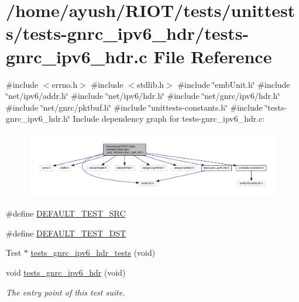\hypertarget{tests-gnrc__ipv6__hdr_8c}{}\section{/home/ayush/\+R\+I\+O\+T/tests/unittests/tests-\/gnrc\+\_\+ipv6\+\_\+hdr/tests-\/gnrc\+\_\+ipv6\+\_\+hdr.c File Reference}
\label{tests-gnrc__ipv6__hdr_8c}
{\ttfamily \#include $<$errno.\+h$>$}\newline
{\ttfamily \#include $<$stdlib.\+h$>$}\newline
{\ttfamily \#include \char`\"{}emb\+Unit.\+h\char`\"{}}\newline
{\ttfamily \#include \char`\"{}net/ipv6/addr.\+h\char`\"{}}\newline
{\ttfamily \#include \char`\"{}net/ipv6/hdr.\+h\char`\"{}}\newline
{\ttfamily \#include \char`\"{}net/gnrc/ipv6/hdr.\+h\char`\"{}}\newline
{\ttfamily \#include \char`\"{}net/gnrc/pktbuf.\+h\char`\"{}}\newline
{\ttfamily \#include \char`\"{}unittests-\/constants.\+h\char`\"{}}\newline
{\ttfamily \#include \char`\"{}tests-\/gnrc\+\_\+ipv6\+\_\+hdr.\+h\char`\"{}}\newline
Include dependency graph for tests-\/gnrc\+\_\+ipv6\+\_\+hdr.c\+:
\nopagebreak
\begin{figure}[H]
\begin{center}
\leavevmode
\includegraphics[width=350pt]{tests-gnrc__ipv6__hdr_8c__incl}
\end{center}
\end{figure}
\begin{DoxyCompactItemize}
\item 
\#define \hyperlink{tests-gnrc__ipv6__hdr_8c_aa4c51543e0d0fa390349bc4655d74639}{D\+E\+F\+A\+U\+L\+T\+\_\+\+T\+E\+S\+T\+\_\+\+S\+RC}
\item 
\#define \hyperlink{tests-gnrc__ipv6__hdr_8c_af036f8b203b4e892d3552d3ba77849d0}{D\+E\+F\+A\+U\+L\+T\+\_\+\+T\+E\+S\+T\+\_\+\+D\+ST}
\item 
Test $\ast$ \hyperlink{tests-gnrc__ipv6__hdr_8c_a10c8350ed23c4b8fa76c4123ed5b38a4}{tests\+\_\+gnrc\+\_\+ipv6\+\_\+hdr\+\_\+tests} (void)
\item 
void \hyperlink{group__unittests_ga5f40f856d40dbcd2b69c5176f7038062}{tests\+\_\+gnrc\+\_\+ipv6\+\_\+hdr} (void)
\begin{DoxyCompactList}\small\item\em The entry point of this test suite. \end{DoxyCompactList}\end{DoxyCompactItemize}



